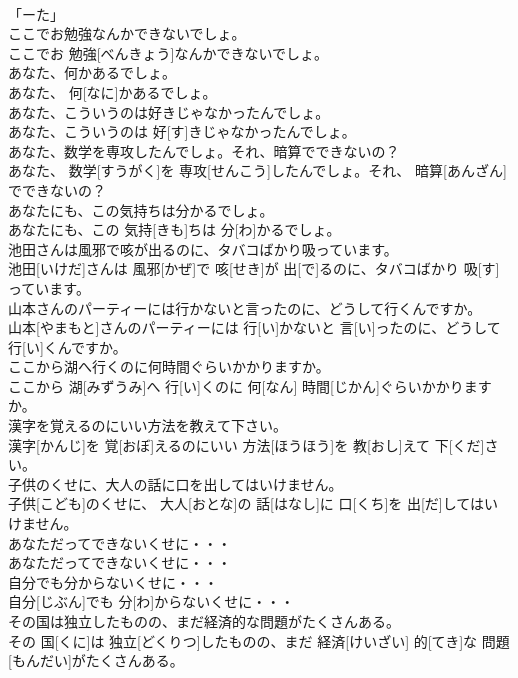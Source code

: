\documentclass[8pt]{extreport}
\begin{document}
\begin{CJK}{UTF8}{min}
\\	「ーた」
\\	ここでお勉強なんかできないでしょ。	
\\	ここでお 勉強[べんきょう]なんかできないでしょ。	
\\	あなた、何かあるでしょ。	
\\	あなた、 何[なに]かあるでしょ。	
\\	あなた、こういうのは好きじゃなかったんでしょ。	
\\	あなた、こういうのは 好[す]きじゃなかったんでしょ。	
\\	あなた、数学を専攻したんでしょ。それ、暗算でできないの？	
\\	あなた、 数学[すうがく]を 専攻[せんこう]したんでしょ。それ、 暗算[あんざん]でできないの？	
\\	あなたにも、この気持ちは分かるでしょ。	
\\	あなたにも、この 気持[きも]ちは 分[わ]かるでしょ。	
\\	池田さんは風邪で咳が出るのに、タバコばかり吸っています。	
\\	池田[いけだ]さんは 風邪[かぜ]で 咳[せき]が 出[で]るのに、タバコばかり 吸[す]っています。	
\\	山本さんのパーティーには行かないと言ったのに、どうして行くんですか。	
\\	山本[やまもと]さんのパーティーには 行[い]かないと 言[い]ったのに、どうして 行[い]くんですか。	
\\	ここから湖へ行くのに何時間ぐらいかかりますか。	
\\	ここから 湖[みずうみ]へ 行[い]くのに 何[なん] 時間[じかん]ぐらいかかりますか。	
\\	漢字を覚えるのにいい方法を教えて下さい。	
\\	漢字[かんじ]を 覚[おぼ]えるのにいい 方法[ほうほう]を 教[おし]えて 下[くだ]さい。	
\\	子供のくせに、大人の話に口を出してはいけません。	
\\	子供[こども]のくせに、 大人[おとな]の 話[はなし]に 口[くち]を 出[だ]してはいけません。	
\\	あなただってできないくせに・・・	
\\	あなただってできないくせに・・・	
\\	自分でも分からないくせに・・・	
\\	自分[じぶん]でも 分[わ]からないくせに・・・	
\\	その国は独立したものの、まだ経済的な問題がたくさんある。	
\\	その 国[くに]は 独立[どくりつ]したものの、まだ 経済[けいざい] 的[てき]な 問題[もんだい]がたくさんある。	

\end{CJK}
\end{document}
